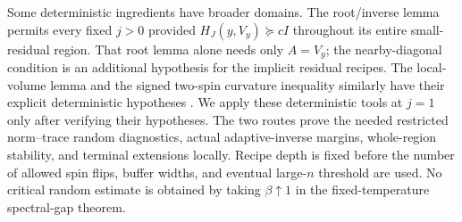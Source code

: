 Some deterministic ingredients have broader domains. The root/inverse
lemma permits every fixed $j>0$ provided $H_J(y,V_y)\succeq cI$
throughout its entire small-residual region. That root lemma alone
needs only $A=V_y$; the nearby-diagonal condition is an additional
hypothesis for the implicit residual recipes. The local-volume lemma and
the signed two-spin curvature inequality similarly have their explicit
deterministic hypotheses
\cite[Lemmas~5.6, 5.7 and~8.1]{AcceptedGap}.
We apply these deterministic tools at $j=1$ only after verifying their
hypotheses. The two routes prove the needed restricted norm--trace
random diagnostics, actual adaptive-inverse margins, whole-region
stability, and terminal extensions locally. Recipe depth is fixed before
the number of allowed spin flips, buffer widths, and eventual large-$n$
threshold are used. No critical random estimate is obtained by taking
$\beta\uparrow1$ in the fixed-temperature spectral-gap theorem.
